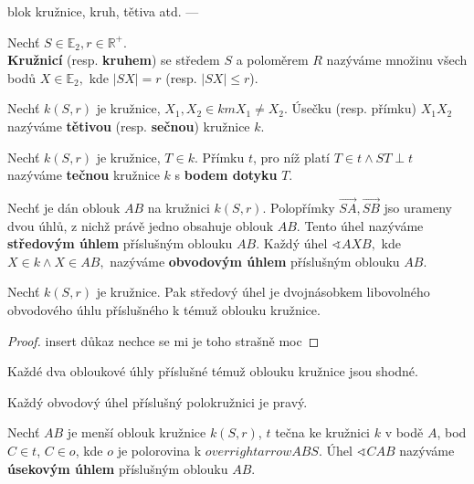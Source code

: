 blok kružnice, kruh, tětiva atd. ---
\begin{definition}
  Nechť $S \in \mathbb E_2, r \in \mathbb R^+.$\\
  \textbf{Kružnicí} (resp. \textbf{kruhem}) se středem $S$ a poloměrem $R$ nazýváme množinu všech bodů $X\in \mathbb E_2, $ kde $|SX|=r$ (resp. $|SX|\leq r$).
\end{definition}

\begin{definition}
  Nechť $k(S,r)$ je kružnice, $X_1, X_2 \in km X_1\ne X_2.$ Úsečku (resp. přímku) $X_1X_2$ nazýváme \textbf{tětivou} (resp. \textbf{sečnou}) kružnice $k$.
\end{definition}


\begin{definition}
  Nechť $k(S,r)$ je kružnice, $T\in k$. Přímku $t$, pro níž platí $T\in t \land ST \perp t$ nazýváme \textbf{tečnou} kružnice $k$ s \textbf{bodem dotyku} $T$.
\end{definition}

\begin{definition}
  Nechť je dán oblouk $AB$ na kružnici $k(S,r).$ Polopřímky $\overrightarrow{SA}, \overrightarrow{SB}$ jso urameny dvou úhlů, z nichž právě jedno obsahuje oblouk $AB$. Tento úhel nazýváme \textbf{středovým úhlem} příslušným oblouku $AB$. Každý úhel $\sphericalangle AXB,$ kde $X\in k \land X\in AB,$ nazýváme \textbf{obvodovým úhlem} příslušným oblouku $AB$.
\end{definition}

\begin{veta}
  Nechť $k(S,r)$ je kružnice. Pak středový úhel je dvojnásobkem libovolného obvodového úhlu příslušného k témuž oblouku kružnice.
\end{veta}


\begin{proof}
  insert důkaz nechce se mi je toho strašně moc
\end{proof}


\begin{veta}
  Každé dva obloukové úhly příslušné témuž oblouku kružnice jsou shodné.
\end{veta}


\begin{veta}[Thaletova]
  Každý obvodový úhel příslušný polokružnici je pravý.
\end{veta}

\begin{definition}
  Nechť $AB$ je menší oblouk kružnice $k(S,r)$, $t$ tečna ke kružnici $k$ v bodě $A$, bod $C\in t$, $C\in o$, kde $o$ je polorovina k $overrightarrow{ABS}.$ Úhel $\sphericalangle CAB$ nazýváme \textbf{úsekovým úhlem} příslušným oblouku $AB$.
\end{definition}


